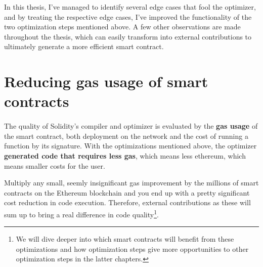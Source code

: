 In this thesis, I've managed to identify several edge cases that fool the optimizer, and by treating the respective edge cases, I've improved the functionality of the two optimization steps mentioned above. A few other observations are made throughout the thesis, which can easily transform into external contributions to ultimately generate a more efficient smart contract.

\section{Reducing gas usage of smart contracts}
\paragraph*{}
The quality of Solidity's compiler and optimizer is evaluated by the \textbf{gas usage} of the smart contract, both deployment on the network and the cost of running a function by its signature. With the optimizations mentioned above, the optimizer \textbf{generated code that requires less gas}, which means less ethereum, which means smaller costs for the user.

Multiply any small, seemly insignificant gas improvement by the millions of smart contracts on the Ethereum blockchain and you end up with a pretty significant cost reduction in code execution. Therefore, external contributions as these will sum up to bring a real difference in code quality\footnote[1]{We will dive deeper into which smart contracts will benefit from these optimizations and how optimization steps give more opportunities to other optimization steps in the latter chapters.}.
